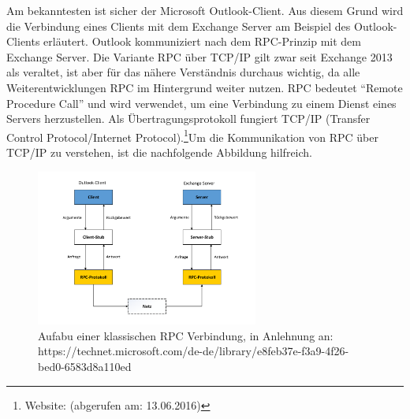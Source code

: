 Am bekanntesten ist sicher der Microsoft Outlook-Client. Aus diesem Grund wird die Verbindung eines Clients mit dem Exchange Server am Beispiel des Outlook-Clients erläutert. Outlook kommuniziert nach dem RPC-Prinzip mit dem Exchange Server. Die Variante RPC über TCP/IP  gilt zwar seit Exchange 2013 als veraltet, ist aber für das nähere Verständnis durchaus wichtig, da alle Weiterentwicklungen RPC im Hintergrund weiter nutzen. RPC bedeutet \enquote{Remote Procedure Call} und wird verwendet, um eine Verbindung zu einem Dienst eines Servers herzustellen. Als Übertragungsprotokoll fungiert TCP/IP (Transfer Control Protocol/Internet Protocol).\footnote{Website: \citeauthor{MSXrpc} (abgerufen am: 13.06.2016)}Um die Kommunikation von RPC über TCP/IP zu verstehen, ist die nachfolgende Abbildung hilfreich.

\begin{figure}[h!]
\centering
	\includegraphics[width=0.65\textwidth]{Abbildungen/RPC_TCP.pdf}
	\caption[Aufbau einer klassischen RPC Verbindung]{Aufabu einer klassischen RPC Verbindung,    in Anlehnung an:\\https://technet.microsoft.com/de-de/library/e8feb37e-f3a9-4f26-bed0-6583d8a110ed}
	\label{fig:RPC_TCP}
\end{figure}

